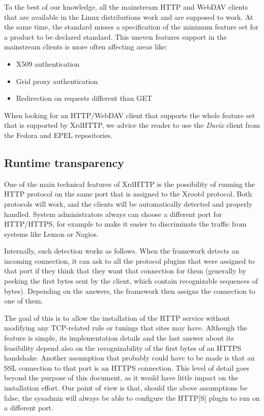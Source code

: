 \documentclass[12pt]{article} %
\begin{document}
To the best of our knowledge, all the mainstream HTTP and WebDAV clients that are available in the Linux distributions work and are supposed to work. At the same time, the standard misses a specification of the minimum feature set for a product to be declared standard. This uneven features support in the mainstream clients is more often affecting areas like:
\begin{itemize}
\item X509 authentication
\item Grid proxy authentication
\item Redirection on requests different than GET
\end{itemize}
When looking for an HTTP/WebDAV client that supports the whole feature set that is supported by XrdHTTP, we advice the reader to use the \textit{Davix} client from the Fedora and EPEL repositories.

\subsection{Runtime transparency}

One of the main technical features of XrdHTTP is the possibility of running the HTTP protocol on the same port that is assigned to the Xrootd protocol. Both protocols will work, and the clients will be automatically detected and properly handled. System administrators always can choose a different port for HTTP/HTTPS, for example to make it easier to discriminate the traffic from systems like Lemon or Nagios.

Internally, such detection works as follows. When the framework detects an incoming connection, it can ask to all the protocol plugins that were assigned to that port if they think that they want that connection for them (generally by peeking the first bytes sent by the client, which contain recognizable sequences of bytes). Depending on the answers, the framework then assigns the connection to one of them.
 
The goal of this is to allow the installation of the HTTP service without modifying any TCP-related rule or tunings that sites may have.
Although the feature is simple, its implementation details and the last answer about its feasibility depend also on the recognizability of the first bytes of an HTTPS handshake. Another assumption that probably could have to be made is that an SSL connection to that port is an HTTPS connection. This level of detail goes beyond the purpose of this document, as it would have little impact on the installation effort. Our point of view is that, should the above assumptions be false, the sysadmin will always be able to configure the HTTP[S] plugin to run on a different port.
\end{document}
